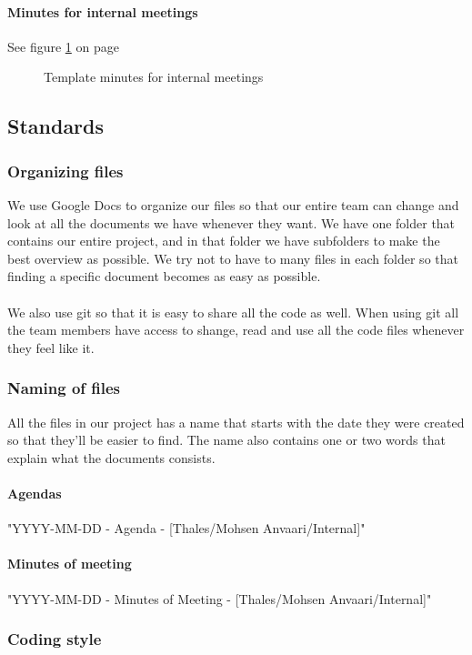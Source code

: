 \paragraph{Minutes for internal meetings} \hfill
\newline
See figure \ref{fig:minutesinternal} on page \pageref{fig:minutesinternal}
\begin{figure}[hbt]
\begin{center}
\caption{Template minutes for internal meetings}\label{fig:minutesinternal}
\end{center}
\end{figure}

\subsection{Standards}

\subsubsection{Organizing files}
We use Google Docs to organize our files so that our entire team can change and look at all the documents we have whenever they want. We have one folder that contains our entire project, and in that folder we have subfolders to make the best overview as possible. We try not to have to many files in each folder so that finding a specific document becomes as easy as possible.
\\
\\
We also use git so that it is easy to share all the code as well. When using git all the team members have access to shange, read and use all the code files whenever they feel like it.

\subsubsection{Naming of files}
All the files in our project has a name that starts with the date they were created so that they’ll be easier to find. The name also contains one or two words that explain what the documents consists.

\paragraph{Agendas}\hfill
\newline
"YYYY-MM-DD - Agenda - [Thales/Mohsen Anvaari/Internal]"

\paragraph{Minutes of meeting}\hfill
\newline
"YYYY-MM-DD - Minutes of Meeting - [Thales/Mohsen Anvaari/Internal]"

\subsubsection{Coding style}


